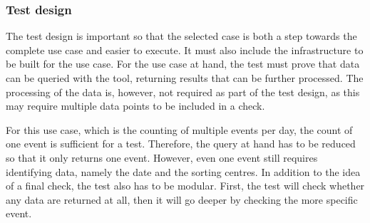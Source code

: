 \subsubsection*{Test design}

The test design is important so that the selected case is both a step towards the complete use case and easier to execute. It must also include the infrastructure to be built for the use case. For the use case at hand, the test must prove that data can be queried with the tool, returning results that can be further processed. The processing of the data is, however, not required as part of the test design, as this may require multiple data points to be included in a check.

For this use case, which is the counting of multiple events per day, the count of one event is sufficient for a test. Therefore, the query at hand has to be reduced so that it only returns one event. However, even one event still requires identifying data, namely the date and the sorting centres. In addition to the idea of a final check, the test also has to be modular. First, the test will check whether any data are returned at all, then it will go deeper by checking the more specific event.
